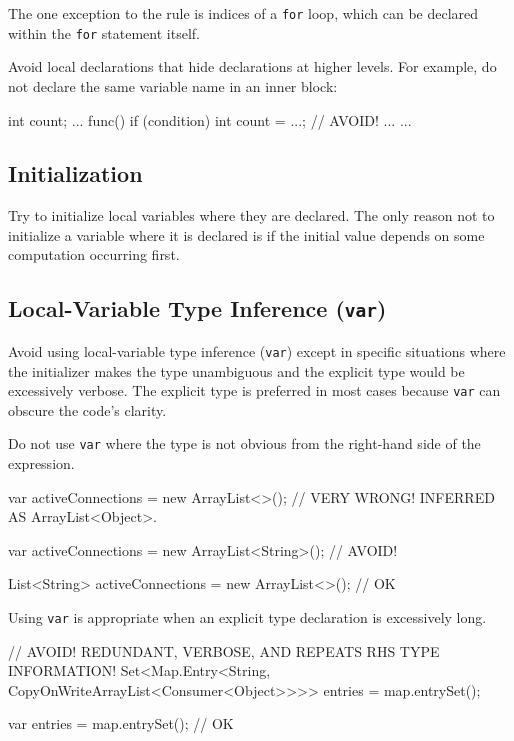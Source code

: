 \documentclass{article}
\begin{document}
The one exception to the rule is indices of a \texttt{for} loop, which can be declared within the
\texttt{for} statement itself.

\begin{snippet}
for (int i = 0; i < maxLoops; i++) { ...
\end{snippet}

Avoid local declarations that hide declarations at higher levels. For example, do not declare the
same variable name in an inner block:

\begin{snippet}
int count;
...
func() {
    if (condition) {
        int count = ...; // AVOID!
        ...
    }
    ...
}
\end{snippet}

\subsection{Initialization}

Try to initialize local variables where they are declared. The only reason not to initialize a
variable where it is declared is if the initial value depends on some computation occurring first.

\subsection{Local-Variable Type Inference (\texttt{var})}

Avoid using local-variable type inference (\texttt{var}) except in specific situations where the
initializer makes the type unambiguous and the explicit type would be excessively verbose. The
explicit type is preferred in most cases because \texttt{var} can obscure the code's clarity.

Do not use \texttt{var} where the type is not obvious from the right-hand side of the expression.

\begin{snippet}
var activeConnections = new ArrayList<>();          // VERY WRONG! INFERRED AS ArrayList<Object>.

var activeConnections = new ArrayList<String>();    // AVOID!

List<String> activeConnections = new ArrayList<>(); // OK
\end{snippet}

Using \texttt{var} is appropriate when an explicit type declaration is excessively long.

\begin{snippet}
// AVOID! REDUNDANT, VERBOSE, AND REPEATS RHS TYPE INFORMATION!
Set<Map.Entry<String, CopyOnWriteArrayList<Consumer<Object>>>> entries = map.entrySet();

var entries = map.entrySet(); // OK
\end{snippet}
\end{document}
